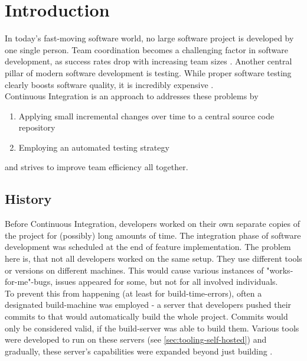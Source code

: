 \section{Introduction}\label{sec:introduction}

In today's fast-moving software world, no large software project is developed by
one single person. Team coordination becomes a challenging factor in software
development, as success rates drop with increasing team sizes
\cite{ambler:2010}. Another central pillar of modern software development is
testing. While proper software testing clearly boosts software quality, it is
incredibly expensive \cite{dustin:1999}.\\

Continuous Integration is an approach to addresses these problems by
\begin{enumerate}[label=(\alph*)]
    \item Applying small incremental changes over time to a central source code
       repository
    \item Employing an automated testing strategy
\end{enumerate}

and strives to improve team efficiency all together.

\subsection{History}\label{sec:history}

Before Continuous Integration, developers worked on their own separate copies of
the project for (possibly) long amounts of time. The integration phase of
software development was scheduled at the end of feature implementation. The
problem here is, that not all developers worked on the same setup. They use
different tools or versions on different machines. This would cause various
instances of "works-for-me"-bugs, issues appeared for some, but not for all
involved individuals.\\

To prevent this from happening (at least for build-time-errors), often a
designated build-machine was employed - a server that developers pushed their
commits to that would automatically build the whole project. Commits would only
be considered valid, if the build-server was able to build them. Various tools
were developed to run on these servers (see \ref{sec:tooling-self-hosted}) and gradually,
these server's capabilities were expanded beyond just building
\cite{zilberfeld:2013}.\\

